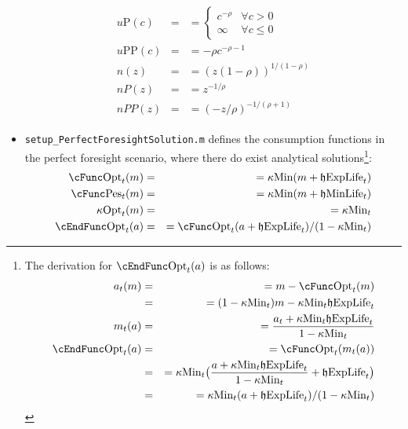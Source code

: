 \documentclass[titlepage,abstract]{\econtex}
\providecommand{\kappaMin}{\kappa\text{Min}}
\providecommand{\cFuncOpt}{\cFunc\text{Opt}}
\providecommand{\cFuncPes}{\cFunc\text{Pes}}
\providecommand{\cEndFuncOpt}{\cEndFunc\text{Opt}}
\providecommand{\kappaOpt}{\kappa\text{Opt}}
\providecommand{\hEndExpLife}{\mathfrak{h}\text{ExpLife}}
\providecommand{\hEndMinLife}{\mathfrak{h}\text{MinLife}}
\providecommand{\uP}{u\text{P}}
\providecommand{\uPP}{u\text{PP}}
\begin{document}
\begin{itemize}
\begin{equation}
\begin{gathered}
\begin{aligned}
      \uP(c)  &=& = 
      \begin{cases}
      c^{-\rho} & \forall c>0 \\
      \infty & \forall c \leq 0
      \end{cases} \\
      \uPP(c)  &=& =  -\rho c^{-\rho-1} \\
      n(z)  &=& =  (z(1-\rho))^{1/(1-\rho)} \\
      nP(z)  &=& =  z^{-1/\rho} \\
      nPP(z)  &=& =  (-z/\rho)^{-1/(\rho+1)}
      \end{aligned}\end{gathered}\end{equation}
      \item \texttt{setup\_PerfectForesightSolution.m} defines the consumption functions in the perfect foresight scenario, where there do exist analytical solutions\footnote{
          The derivation for $\cEndFuncOpt_{t}(a)$ is as follows:
          \begin{equation}\begin{gathered}\begin{aligned}
          a_{t}(m)  &=& =  m-\cFuncOpt_{t}(m) \\
           &=& =  (1-\kappaMin_{t}) m -\kappaMin_{t} \hEndExpLife_{t} \\
          m_{t} (a)  &=& =  \frac{a_{t}+ \kappaMin_{t}\hEndExpLife_{t}}{1-\kappaMin_{t}} \\
          \cEndFuncOpt_{t} (a)  &=& =  \cFuncOpt_{t}(m_{t}(a)) \\
           &=& =  \kappaMin_{t} \big(\frac{a+ \kappaMin_{t}\hEndExpLife_{t}}{1-\kappaMin_{t}} + \hEndExpLife_{t}\big) \\
           &=& =  \kappaMin_{t} (a+ \hEndExpLife_{t})/(1-\kappaMin_{t})
          \end{aligned}\end{gathered}\end{equation}
          }:
          \begin{equation}\begin{gathered}\begin{aligned}
          \cFuncOpt_{t}(m)  &=& =  \kappaMin (m+\hEndExpLife_{t}) \\
          \cFuncPes_{t}(m)  &=& =  \kappaMin (m+\hEndMinLife_{t}) \\
          \kappaOpt_{t}(m)  &=& =  \kappaMin_{t} \\
          \cEndFuncOpt_{t}(a)  &=& =  \cFuncOpt_{t}(a+\hEndExpLife_{t})/(1-\kappaMin_{t}) \\

\end{aligned}
\end{gathered}
\end{equation}
\end{itemize}
\end{document}
